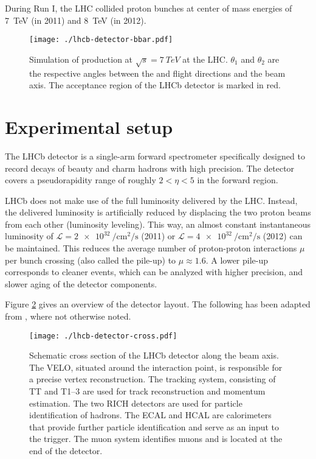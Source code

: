 During Run I, the LHC collided proton bunches at center of mass energies of \SI{7}{TeV} (in 2011) and \SI{8}{TeV} (in 2012).

\begin{figure}
\centering
\texttt{[image: ./lhcb-detector-bbar.pdf]}
\caption{
  Simulation of \Pqb\APqb production at $\sqrt{s} = \SI{7}{TeV}$ at the LHC. $θ_1$ and $θ_2$ are the respective angles between the \Pqb and \APqb flight directions and the beam axis.
  The acceptance region of the LHCb detector is marked in red.
}
\label{fig:bbarprod}
\end{figure}

\section{Experimental setup}

The LHCb detector is a single-arm forward spectrometer specifically designed to record decays of beauty and charm hadrons with high precision.
The detector covers a pseudorapidity range of roughly $2 < η < 5$ in the forward region.

LHCb does not make use of the full luminosity delivered by the LHC.
Instead, the delivered luminosity is artificially reduced by displacing the two proton beams from each other (luminosity leveling).
This way, an almost constant instantaneous luminosity of $\mathcal{L}=\SI{2e32}{\per\centi\metre\squared\per\second}$ (2011) or $\mathcal{L}=\SI{4e32}{\per\centi\metre\squared\per\second}$ (2012) can be maintained.
This reduces the average number of proton-proton interactions $\mu$ per bunch crossing (also called the pile-up) to $\mu \approx \num{1.6}$. \cite{Trigger2012}
A lower pile-up corresponds to cleaner events, which can be analyzed with higher precision, and slower aging of the detector components.

Figure \ref{fig:lhcbdetector} gives an overview of the detector layout.
The following has been adapted from \cite{LHCb2008}, where not otherwise noted.

\begin{figure}
\centering
\texttt{[image: ./lhcb-detector-cross.pdf]}
\caption{
  Schematic cross section of the LHCb detector along the beam axis.
  The \acrshort{VELO}, situated around the interaction point, is responsible for a precise vertex reconstruction.
  The tracking system, consisting of TT and T1--3 are used for track reconstruction and momentum estimation.
  The two RICH detectors are used for particle identification of hadrons.
  The ECAL and HCAL are calorimeters that provide further particle identification and serve as an input to the trigger.
  The muon system identifies muons and is located at the end of the detector.\cite{LHCb2008}
}
\label{fig:lhcbdetector}
\end{figure}

